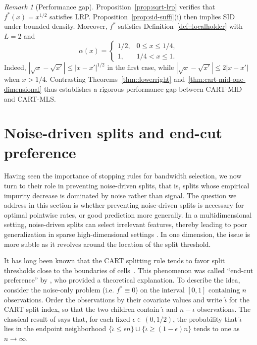 \documentclass[11pt]{article}
\theoremstyle{plain}
\theoremstyle{definition}
\theoremstyle{remark}
\newtheorem{remark}[theorem]{Remark}
\theoremstyle{plain}
\newcommand{\1}{\mathbbm{1}}
\begin{document}
\begin{remark}[Performance gap]
    Proposition~\ref{prop:sqrt-lrp} verifies that $f^*(x)=x^{1/2}$ satisfies LRP.
    Proposition~\ref{prop:sid-suffi}(i) then implies SID under bounded density.
    Moreover, $f^*$ satisfies Definition~\ref{def::localholder} with $L=2$ and
    \[
        \alpha(x)=
        \begin{cases}
            1/2, & 0\le x\le 1/4,\\
            1, & 1/4<x\le1.
        \end{cases}
    \]
    Indeed, $|\sqrt{x}-\sqrt{x'}|\le |x-x'|^{1/2}$ in the first case,
    while $|\sqrt{x}-\sqrt{x'}|\le 2|x-x'|$ when $x>1/4$.
    Contrasting Theorems~\ref{thm::lowerright} and~\ref{thm:cart-mid-one-dimensional} thus establishes a rigorous performance gap between CART-MID and CART-MLS.
\end{remark}



\section{Noise-driven splits and end-cut preference}
\label{sec:split-reliability-lower-bound}

Having seen the importance of stopping rules for bandwidth selection, we now turn to their role in preventing noise-driven splits, that is, splits whose empirical impurity decrease is dominated by noise rather than signal.
The question we address in this section is whether preventing noise-driven splits is necessary for optimal pointwise rates, or good prediction more generally.
In a multidimensional setting, noise-driven splits can select irrelevant features, thereby leading to poor generalization in sparse high-dimensional settings \citep{tan2024statistical}.
In one dimension, the issue is more subtle as it revolves around the location of the split threshold.

It has long been known that the CART splitting rule tends to favor split thresholds close to the boundaries of cells~\citep{morgan1973thaid}.
This phenomenon was called ``end-cut preference'' by \citet{breiman1984classification}, who provided a theoretical explanation.
To describe the idea, consider the noise-only problem (i.e. $f^* \equiv 0$) on the
interval $[0,1]$ containing $n$ observations.
Order the observations by their covariate values and write $\hat\iota$ for the CART split index, so that the two children
contain $\hat\iota$ and $n-\hat\iota$ observations. 
The classical result
of \citet[Chapter~11.8]{breiman1984classification} says that, for each fixed
$\epsilon\in(0,1/2)$, the probability that $\hat\iota$ lies in the endpoint neighborhood
$\{\hat\iota\le \epsilon n\}\cup\{\hat\iota\ge (1-\epsilon)n\}$ tends to one as $n \to\infty$.
\end{document}
